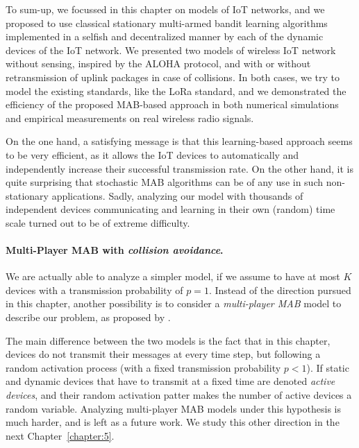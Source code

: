 
To sum-up, we focussed in this chapter on models of IoT networks, and we proposed to use classical stationary multi-armed bandit learning algorithms implemented in a selfish and decentralized manner by each of the dynamic devices of the IoT network.
We presented two models of wireless IoT network without sensing, inspired by the ALOHA protocol, and with or without retransmission of uplink packages in case of collisions.
In both cases, we try to model the existing standards, like the LoRa standard, and we demonstrated the efficiency of the proposed MAB-based approach in both numerical simulations and empirical measurements on real wireless radio signals.

On the one hand, a satisfying message is that this learning-based approach seems to be very efficient, as it allows the IoT devices to automatically and independently increase their successful transmission rate.
On the other hand, it is quite surprising that stochastic MAB algorithms can be of any use in such non-stationary applications.
Sadly, analyzing our model with thousands of independent devices communicating and learning in their own (random) time scale turned out to be of extreme difficulty.



\paragraph{Multi-Player MAB with \emph{collision avoidance}.}

We are actually able to analyze a simpler model, if we assume to have at most $K$ devices with a transmission probability of $p=1$.
Instead of the direction pursued in this chapter, another possibility is to consider a \emph{multi-player MAB} model to describe our problem, as proposed by \cite{Zhao10}.

The main difference between the two models is the fact that in this chapter, devices do not transmit their messages at every time step, but following a random activation process (with a fixed transmission probability $p < 1$).
If static and dynamic devices that have to transmit at a fixed time are denoted \emph{active devices},
and their random activation patter makes the number of active devices a random variable.
Analyzing multi-player MAB models under this hypothesis is much harder, and is left as a future work.
%
We study this other direction in the next Chapter~\ref{chapter:5}.

